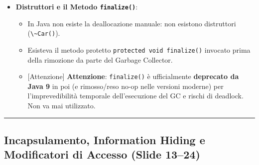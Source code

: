 \documentclass[11pt,a4paper,oneside]{report}
\newcommand{\passthrough}[1]{#1}
\providecommand{\tightlist}{\setlength{\itemsep}{0pt}\setlength{\parskip}{0pt}}
\begin{document}
\begin{itemize}
  \begin{itemize}
  \tightlist
  \item
    Più costruttori con firme distinte.
  \item
    La chiamata \passthrough{\lstinline!this(...)!} verso un costruttore
    fratello serve a evitare duplicazione di logica di validazione e
    \textbf{deve essere tassativamente la prima riga di codice nel corpo
    del costruttore}.
  \item
    \emph{Meme delle slide (p.~11)}: Il matematico in lacrime che grida
    \emph{``Abuse of notation''} vs il Chad Programmer che usa
    l'overloading per semplificare il codice.
  \end{itemize}
\item
  \textbf{Distruttori e il Metodo \passthrough{\lstinline!finalize()!}}:

  \begin{itemize}
  \tightlist
  \item
    In Java non esiste la deallocazione manuale: non esistono
    distruttori (\passthrough{\lstinline!\~Car()!}).
  \item
    Esisteva il metodo protetto
    \passthrough{\lstinline!protected void finalize()!} invocato prima
    della rimozione da parte del Garbage Collector.
  \item
    {[}Attenzione{]} \textbf{Attenzione}:
    \passthrough{\lstinline!finalize()!} è ufficialmente
    \textbf{deprecato da Java 9} in poi (e rimosso/reso no-op nelle
    versioni moderne) per l'imprevedibilità temporale dell'esecuzione
    del GC e rischi di deadlock. Non va mai utilizzato.
  \end{itemize}
\end{itemize}

\begin{center}\rule{0.5\linewidth}{0.5pt}\end{center}

\subsection{Incapsulamento, Information Hiding e Modificatori di Accesso
(Slide
13--24)}\label{chap07_incapsulamento-information-hiding-e-modificatori-di-accesso-slide-1324}
\end{document}

